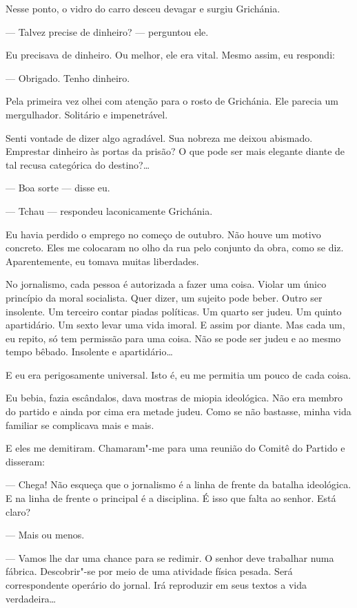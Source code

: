 Nesse ponto, o vidro do carro desceu devagar e surgiu Grichánia.

--- Talvez precise de dinheiro? --- perguntou ele.

Eu precisava de dinheiro. Ou melhor, ele era vital. Mesmo assim, eu
respondi:

--- Obrigado. Tenho dinheiro.

Pela primeira vez olhei com atenção para o rosto de Grichánia. Ele
parecia um mergulhador. Solitário e impenetrável.

Senti vontade de dizer algo agradável. Sua nobreza me deixou abismado.
Emprestar dinheiro às portas da prisão? O que pode ser mais elegante diante de tal recusa categórica do destino?\ldots{}

--- Boa sorte --- disse eu.

--- Tchau --- respondeu laconicamente Grichánia.

Eu havia perdido o emprego no começo de outubro. Não houve um motivo
concreto. Eles me colocaram no olho da rua pelo conjunto da obra, como
se diz. Aparentemente, eu tomava muitas liberdades.

No jornalismo, cada pessoa é autorizada a fazer uma coisa. Violar um \label{ref2}
único princípio da moral socialista. Quer dizer, um sujeito pode beber.
Outro ser insolente. Um terceiro contar piadas políticas. Um quarto ser
judeu. Um quinto apartidário. Um sexto levar uma vida imoral. E assim
por diante. Mas cada um, eu repito, só tem permissão para uma coisa. Não
se pode ser judeu e ao mesmo tempo bêbado. Insolente e apartidário\ldots{}

E eu era perigosamente universal. Isto é, eu me permitia um pouco de
cada coisa.

Eu bebia, fazia escândalos, dava mostras de miopia ideológica. Não era
membro do partido e ainda por cima era metade judeu. Como se não
bastasse, minha vida familiar se complicava mais e mais.

E eles me demitiram. Chamaram"-me para uma reunião do Comitê do Partido e
disseram:

--- Chega! Não esqueça que o jornalismo é a linha de frente da batalha
ideológica. E na linha de frente o principal é a disciplina. É isso que
falta ao senhor. Está claro?

--- Mais ou menos.

--- Vamos lhe dar uma chance para se redimir. O senhor deve trabalhar
numa fábrica. Descobrir"-se por meio de uma atividade física pesada. Será
correspondente operário do jornal. Irá reproduzir em seus textos a vida
verdadeira\ldots{}

